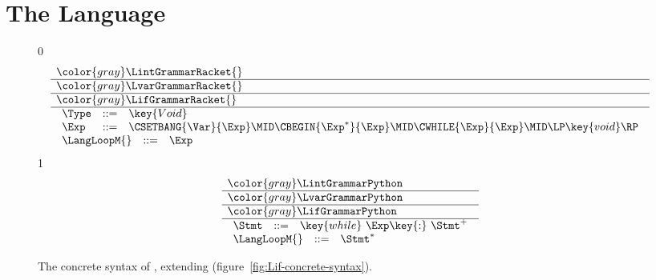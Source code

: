 \documentclass[7x10]{TimesAPriori_MIT}%
\newcommand{\gray}[1]{{\color{gray} #1}}
\def\racketEd{0}
\def\pythonEd{1}
\def\edition{1}
\newcommand{\pythonColor}[0]{}
\numberwithin{theorem}{chapter}
\numberwithin{definition}{chapter}
\numberwithin{equation}{chapter}
\begin{document}
\section{The \LangLoop{} Language}

\newcommand{\LwhileGrammarRacket}{
  \begin{array}{lcl}
   \Type &::=& \key{Void}\\
   \Exp &::=& \CSETBANG{\Var}{\Exp}
      \MID \CBEGIN{\Exp^{*}}{\Exp}
      \MID \CWHILE{\Exp}{\Exp} \MID \LP\key{void}\RP 
  \end{array}
}
\newcommand{\LwhileASTRacket}{
\begin{array}{lcl}
  \Type &::=& \key{Void}\\
  \Exp &::=& \SETBANG{\Var}{\Exp}
       \MID \BEGIN{\Exp^{*}}{\Exp}
       \MID \WHILE{\Exp}{\Exp}
       \MID \VOID{}  
\end{array}
}

\newcommand{\LwhileGrammarPython}{
\begin{array}{rcl}
  \Stmt &::=& \key{while}~ \Exp \key{:}~ \Stmt^{+}
\end{array}
}
\newcommand{\LwhileASTPython}{
\begin{array}{lcl}
\Stmt{} &::=& \WHILESTMT{\Exp}{\Stmt^{+}}
\end{array}
}

\begin{figure}[tp]
\centering
\begin{tcolorbox}[colback=white]
    \small
{\if\edition\racketEd    
\[
\begin{array}{l}
  \gray{\LintGrammarRacket{}} \\ \hline
  \gray{\LvarGrammarRacket{}} \\ \hline
  \gray{\LifGrammarRacket{}} \\ \hline
  \LwhileGrammarRacket \\
  \begin{array}{lcl}
  \LangLoopM{} &::=& \Exp
\end{array}
\end{array}
\]
\fi}
{\if\edition\pythonEd\pythonColor
\[
\begin{array}{l}
  \gray{\LintGrammarPython} \\ \hline
  \gray{\LvarGrammarPython}  \\ \hline
  \gray{\LifGrammarPython} \\ \hline
  \LwhileGrammarPython \\
\begin{array}{rcl}
  \LangLoopM{} &::=& \Stmt^{*}
\end{array}
\end{array}
\]
\fi}
\end{tcolorbox}

\caption{The concrete syntax of \LangLoop{}, extending \LangIf{} (figure~\ref{fig:Lif-concrete-syntax}).}
\label{fig:Lwhile-concrete-syntax}
\end{figure}
\end{document}

